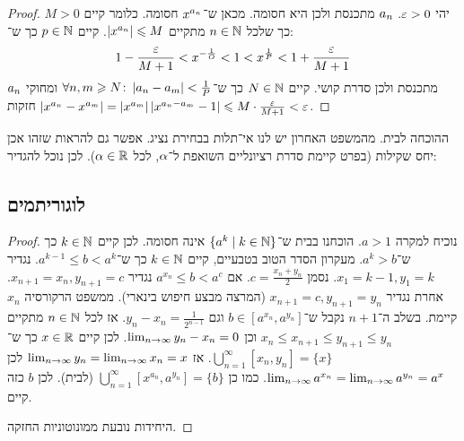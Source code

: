 \documentclass[name=רשימות חשבון דיפרנציאלי ואינטגרלי 1א]{../../../tex/classes/megasumPreamble}
\begin{document}
	\begin{proof}
		יהי $\eg > 0$. $a_n$ מתכנסת ולכן היא חסומה. מכאן ש־$x^{a_n}$ חסומה. כלומר קיים $M > 0$ כך שלכל $n \in \mathbb{N}$ מתקיים $\left \lvert x^{a_n} \right \rvert \leqslant M$. קיים $p \in \mathbb{N}$ כך ש־:
		\[ 1 - \frac{\eg}{M + 1} < x^{- \frac{1}{O}} < 1 < x^{\frac{1}{P}} < 1 + \frac{\eg}{M + 1} \]
		$a_n$ מתכנסת ולכן סדרת קושי. קיים $N \in \mathbb{N}$ כך ש־$\forall n, m \geqslant N \colon \left \lvert a_n - a_m \right \rvert < \frac{1}{P}$ ומחוקי חזקות $\sof{x^{a_n} - x^{a_m}} = \sof{x^{a_m}}\sof{x^{a_n - a_m} - 1} \le M \cdot \frac{\eg}{M + 1} < \eg$.
	\end{proof}

	ההוכחה לבית. מהמשפט האחרון יש לנו אי־תלות בבחירת נציג. אפשר גם להראות שזהו אכן יחס שקילות (בפרט קיימת סדרת רציונליים השואפת ל־$\alpha$, לכל $\alpha \in \mathbb{R}$). לכן נוכל להגדיר:

	
	\subsection{לוגוריתמים}
	
	\begin{proof}
		נוכיח למקרה $a >1$. הוכחנו בבית ש־$\{a^{k} \mid k \in \mathbb{N}\}$ אינה חסומה. לכן קיים $k \in \mathbb{N}$ כך ש־$a^{k} > b$. מעקרון הסדר הטוב בטבעיים, קיים $k \in \mathbb{N}$ כך ש־$a^{k - 1} \le b < a^{k}$. נגדיר $x_1 = k - 1, y_1 = k$. נסמן $c = \frac{x_n + y_n}{2}$. אם $a^{x_n} \le b < a^{c}$ נגדיר $x_{n + 1} = x_n, y_{n + 1} = c$. אחרת נגדיר $x_{n + 1}= c, y_{n + 1} = y_n$ (המרצה מבצע חיפוש בינארי). ממשפט הרקורסיה $x_n$ קיימת. בשלב ה־$n + 1$ נקבל ש־$b \in [a^{x_n}, a^{y_n}]$ וגם $y_n - x_n = \frac{1}{2^{n - 1}}$. אז לכל $n \in \mathbb{N}$ מתקיים $x_n \le x_{n + 1} \le y_{n + 1} \le y_n$ וכן $\lim_{n \to \infty} y_n - x_n = 0$. לכן קיים $x \in \mathbb{R}$ כך ש־$\bigcup^{\infty}_{n = 1} [x_n, y_n] = \{x\}$. אז $\lim_{n \to \infty} y_n = \lim_{n \to \infty} x_n = x$ לכן $\lim_{n \to \infty} a^{x_n} = \lim_{n \to \infty} a^{y_n} = a^{x}$. כמו כן $\bigcup_{n = 1}^{\infty} [x^{a_n}, a^{y_n}] = \{b\}$ (לבית). לכן $b$ כזה קיים.
		
		היחידות נובעת ממונוטוניות החזקה.
	\end{proof}
	
\end{document}
